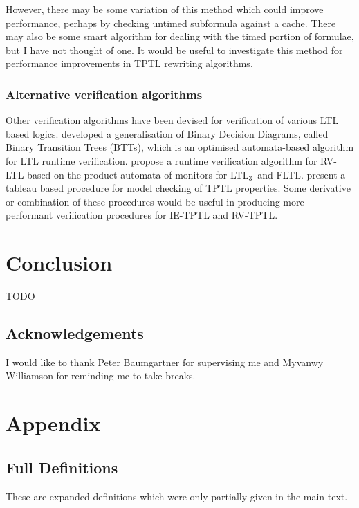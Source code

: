 \documentclass[a4paper]{article}
\newcommand{\ltlt}{LTL$_3$}
\begin{document}
However, there may be some variation of this method which could improve performance, perhaps by checking untimed subformula against a cache. There may also be some smart algorithm for dealing with the timed portion of formulae, but I have not thought of one. It would be useful to investigate this method for performance improvements in TPTL rewriting algorithms.

\subsubsection{Alternative verification algorithms}
Other verification algorithms have been devised for verification of various LTL based logics. \textcite{rosu2005rewriting} developed a generalisation of Binary Decision Diagrams, called Binary Transition Trees (BTTs), which is an optimised automata-based algorithm for LTL runtime verification. \textcite{bauer2010comparing} propose a runtime verification algorithm for RV-LTL based on the product automata of monitors for \ltlt\ and FLTL. \textcite{alur1994really} present a tableau based procedure for model checking of TPTL properties.
Some derivative or combination of these procedures would be useful in producing more performant verification procedures for IE-TPTL and RV-TPTL.


\section{Conclusion}
TODO
\subsection{Acknowledgements}
I would like to thank Peter Baumgartner for supervising me and Myvanwy Williamson for reminding me to take breaks.

\nocite{*}
\printbibliography{}
\newpage
\section{Appendix}\label{appendix}
\subsection{Full Definitions}\label{fulldef}
These are expanded definitions which were only partially given in the main text.
\end{document}

